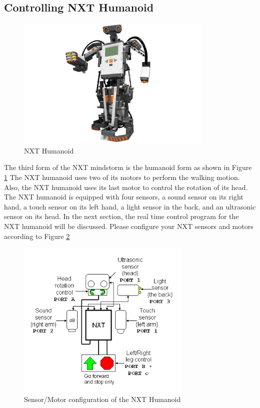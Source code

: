 \documentclass[12pt]{article}
\begin{document}
\subsection{Controlling NXT Humanoid}
\begin{figure}[h]
  \begin{center}
    \includegraphics[height=2.5in]{figure/mindstorm/NXT_humanoid.png}
    \caption{NXT Humanoid \label{fig_NXT_humanoid}}
  \end{center}
\end{figure}
\noindent
The third form of the NXT mindstorm is the humanoid form as shown in Figure \ref{fig_NXT_humanoid}
The NXT humanoid uses two of its motors to perform the walking motion.
Also, the NXT humanoid uses its last motor to control the rotation of its head.
The NXT humanoid is equipped with four sensors, a sound sensor on its right hand, a touch sensor on its left hand,
    a light sensor in the back, and an ultrasonic sensor on its head.
In the next section, the real time control program for the NXT humanoid will be discussed.
Please configure your NXT sensors and motors according to Figure \ref{fig_NXT_human_port}
\begin{figure}[h]
  \begin{center}
    \includegraphics[height=3in]{figure/mindstorm/NXT_human_port.png}
    \caption{Sensor/Motor configuration of the NXT Humanoid\label{fig_NXT_human_port}}
  \end{center}
\end{figure}
\newpage
\end{document}
